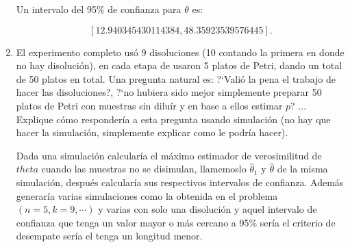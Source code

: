 \documentclass[letterpaper]{article}
\theoremstyle{definition}
\theoremstyle{lemathm}
\theoremstyle{lemathm}
\theoremstyle{lemathm}
\theoremstyle{lemademthm}
\newcommand{\bracs}[1]{\left[ #1 \right] }
\newcommand{\1}{\mathbbm{1}}
\begin{document}
\begin{enumerate}
		Un intervalo del 95\% de confianza para $\theta$ es:

		\[\bracs{12.940345430114384,48.35923539576445}.\]

		\item El experimento completo us\'o 9 disoluciones (10 contando la primera en donde no hay disoluci\'on), en cada etapa de usaron 5 platos de Petri, dando un total de 50 platos en total. Una pregunta natural es: ?`Vali\'o la pena el trabajo de hacer las disoluciones?, ?`no hubiera sido mejor simplemente preparar 50 platos de Petri con muestras sin dilu\'ir y en base a ellos estimar $p$? ... Explique c\'omo  responder\'ia a esta pregunta usando simulaci\'on (no hay que hacer la simulaci\'on, simplemente explicar como le podr\'ia hacer).
		
		Dada una simulación calcularía el máximo estimador de verosimilitud de $theta$ cuando las muestras no se disimulan, llamemoslo $\hat{\theta}_1$ y $\hat{\theta}$ de la misma simulación, después calcularía sus respectivos intervalos de confianza. Además generaría varias simulaciones como la obtenida en el problema $(n=5,k=9,\cdots)$ y varias con solo una disolución y aquel intervalo de confianza que tenga un valor mayor o más cercano a 95\% sería el criterio de desempate sería el tenga un longitud menor.
	\end{enumerate}
\end{document}
